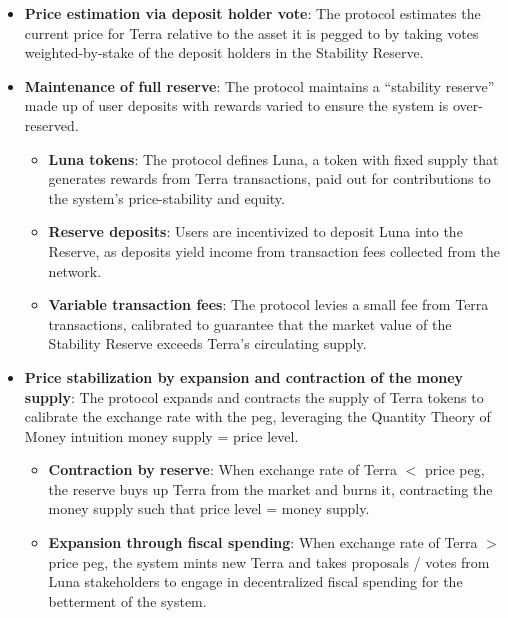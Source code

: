 \documentclass{article}
\begin{document}
\begin{itemize}

\item \textbf{Price estimation via deposit holder vote}: The protocol estimates the current price for Terra relative to the asset it is pegged to by taking votes weighted-by-stake of the deposit holders in the Stability Reserve. 

\item \textbf{Maintenance of full reserve}: The protocol maintains a “stability reserve” made up of user deposits with rewards varied to ensure the system is over-reserved. 
    \begin{itemize}

    \item \textbf{Luna tokens}: The protocol defines Luna, a token with fixed supply that generates rewards from Terra transactions, paid out for contributions to the system's price-stability and equity. 
    \item \textbf{Reserve deposits}: Users are incentivized to deposit Luna into the Reserve, as deposits yield income from transaction fees collected from the network.
    \item \textbf{Variable transaction fees}: The protocol levies a small fee from Terra transactions, calibrated to guarantee that the market value of the Stability Reserve exceeds Terra's circulating supply.
    \end{itemize}
    
\item \textbf{Price stabilization by expansion and contraction of the money supply}: The protocol expands and contracts the supply of Terra tokens to calibrate the exchange rate with the peg, leveraging the Quantity Theory of Money intuition money supply = price level. 
    \begin{itemize}

    \item \textbf{Contraction by reserve}: When exchange rate of Terra $<$ price peg, the reserve buys up Terra from the market and burns it, contracting the money supply such that price level = money supply. 
    \item \textbf{Expansion through fiscal spending}: When exchange rate of Terra $>$ price peg, the system mints new Terra and takes proposals / votes from Luna stakeholders to engage in decentralized fiscal spending for the betterment of the system.
    \end{itemize}
\end{itemize}
\end{document}
